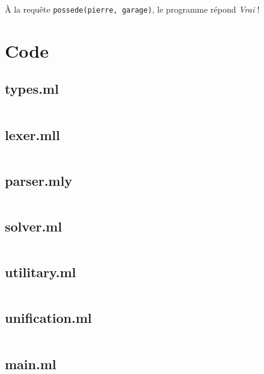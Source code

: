 \documentclass{article}
\newcommand\codefile[1]{\subsection{#1}\inputminted{ocaml}{../Code/#1}}
\begin{document}
À la requête \texttt{possede(pierre, garage)}, le programme répond \emph{Vrai} !




\appendix

\section{Code}
\codefile{types.ml}
\codefile{lexer.mll}
\codefile{parser.mly}
\codefile{solver.ml}
\codefile{utilitary.ml}
\codefile{unification.ml}
\codefile{main.ml}
\end{document}
